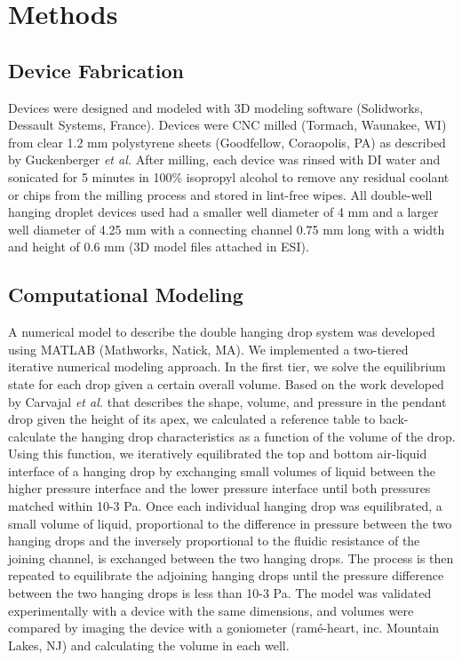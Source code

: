 \section{Methods}
\subsection{Device Fabrication}
Devices were designed and modeled with 3D modeling software (Solidworks, Dessault Systems, France). Devices were CNC milled (Tormach, Waunakee, WI) from clear 1.2 mm polystyrene sheets (Goodfellow, Coraopolis, PA) as described by Guckenberger \textit{et al.}  \cite{Guckenberger2015} After milling, each device was rinsed with DI water and sonicated for 5 minutes in 100\% isopropyl alcohol to remove any residual coolant or chips from the milling process and stored in lint-free wipes. All double-well hanging droplet devices used had a smaller well diameter of 4 mm and a larger well diameter of 4.25 mm with a connecting channel 0.75 mm long with a width and height of 0.6 mm (3D model files attached in ESI).

\subsection{Computational Modeling}
A numerical model to describe the double hanging drop system was developed using MATLAB (Mathworks, Natick, MA). We implemented a two-tiered iterative numerical modeling approach. In the first tier, we solve the equilibrium state for each drop given a certain overall volume. Based on the work developed by Carvajal \textit{et al.}  \cite{Carvajal2011} that describes the shape, volume, and pressure in the pendant drop given the height of its apex, we calculated a reference table to back-calculate the hanging drop characteristics as a function of the volume of the drop. Using this function, we iteratively equilibrated the top and bottom air-liquid interface of a hanging drop by exchanging small volumes of liquid between the higher pressure interface and the lower pressure interface until both pressures matched within 10-3 Pa. Once each individual hanging drop was equilibrated, a small volume of liquid, proportional to the difference in pressure between the two hanging drops and the inversely proportional to the fluidic resistance of the joining channel, is exchanged between the two hanging drops. The process is then repeated to equilibrate the adjoining hanging drops until the pressure difference between the two hanging drops is less than 10-3 Pa. The model was validated experimentally with a device with the same dimensions, and volumes were compared by imaging the device with a goniometer (ram\'{e}-heart, inc. Mountain Lakes, NJ) and calculating the volume in each well.

